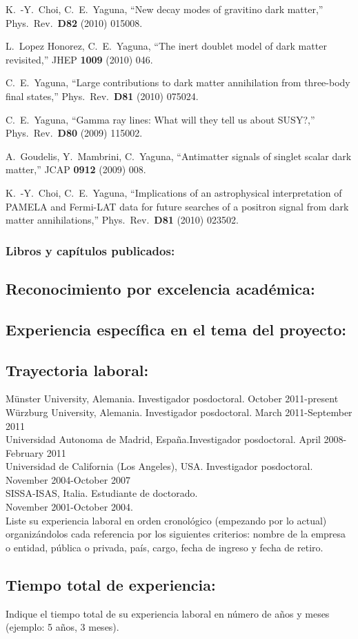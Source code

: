   K.~-Y.~Choi, C.~E.~Yaguna,
  ``New decay modes of gravitino dark matter,''
  Phys.\ Rev.\  {\bf D82 } (2010)  015008.

  L.~Lopez Honorez, C.~E.~Yaguna,
  ``The inert doublet model of dark matter revisited,''
  JHEP {\bf 1009 } (2010)  046.

  C.~E.~Yaguna,
  ``Large contributions to dark matter annihilation from three-body final states,''
  Phys.\ Rev.\  {\bf D81 } (2010)  075024.

  C.~E.~Yaguna,
  ``Gamma ray lines: What will they tell us about SUSY?,''
  Phys.\ Rev.\  {\bf D80 } (2009)  115002.

  A.~Goudelis, Y.~Mambrini, C.~Yaguna,
  ``Antimatter signals of singlet scalar dark matter,''
  JCAP {\bf 0912 } (2009)  008.

  K.~-Y.~Choi, C.~E.~Yaguna,
  ``Implications of an astrophysical interpretation of PAMELA and Fermi-LAT data for future searches of a positron signal from dark matter annihilations,''
  Phys.\ Rev.\  {\bf D81 } (2010)  023502.
\subsubsection{Libros y capítulos publicados:}
\subsection{Reconocimiento por excelencia académica:}
\subsection{Experiencia específica en el tema del proyecto:}
\subsection{Trayectoria laboral:}
\begin{instrucciones}
M\"unster University, Alemania. Investigador posdoctoral. October 2011-present\\
W\"urzburg University, Alemania. Investigador posdoctoral. March 2011-September 2011\\
Universidad Autonoma de Madrid, España.Investigador posdoctoral. April 2008-February 2011\\
Universidad de California (Los Angeles), USA. Investigador posdoctoral. November 2004-October 2007\\
SISSA-ISAS, Italia. Estudiante de doctorado.\\ November 2001-October 2004.\\

  Liste su experiencia laboral en orden cronológico (empezando por lo
  actual) organizándolos cada referencia por los siguientes criterios:
  nombre de la empresa o entidad, pública o privada, país, cargo,
  fecha de ingreso y fecha de retiro.
\end{instrucciones}
\subsection{Tiempo total de experiencia:}
\begin{instrucciones}
  Indique el tiempo total de su experiencia laboral en número de años
  y meses (ejemplo: 5 años, 3 meses).
\end{instrucciones}


